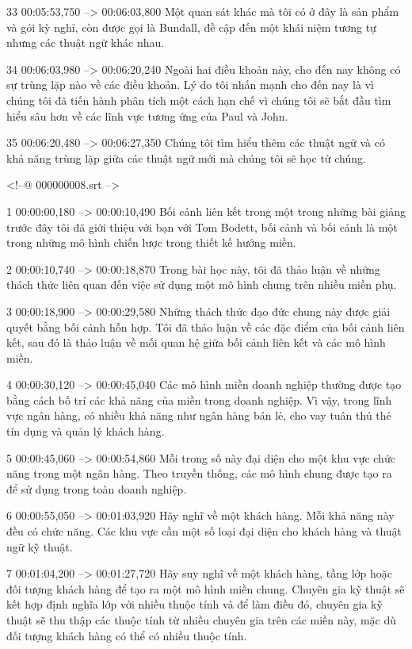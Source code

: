 33
00:05:53,750 --> 00:06:03,800
Một quan sát khác mà tôi có ở đây là sản phẩm và gói kỳ nghỉ, còn được gọi là Bundall, đề cập đến một khái niệm tương tự nhưng các thuật ngữ khác nhau.

34
00:06:03,980 --> 00:06:20,240
Ngoài hai điều khoản này, cho đến nay không có sự trùng lặp nào về các điều khoản.  Lý do tôi nhấn mạnh cho đến nay là vì chúng tôi đã tiến hành phân tích một cách hạn chế vì chúng tôi sẽ bắt đầu tìm hiểu sâu hơn về các lĩnh vực tương ứng của Paul và John.

35
00:06:20,480 --> 00:06:27,350
Chúng tôi tìm hiểu thêm các thuật ngữ và có khả năng trùng lặp giữa các thuật ngữ mới mà chúng tôi sẽ học từ chúng.

<!--@ 000000008.srt -->

1
00:00:00,180 --> 00:00:10,490
Bối cảnh liên kết trong một trong những bài giảng trước đây tôi đã giới thiệu với bạn với Tom Bodett, bối cảnh và bối cảnh là một trong những mô hình chiến lược trong thiết kế hướng miền.

2
00:00:10,740 --> 00:00:18,870
Trong bài học này, tôi đã thảo luận về những thách thức liên quan đến việc sử dụng một mô hình chung trên nhiều miền phụ.

3
00:00:18,900 --> 00:00:29,580
Những thách thức đạo đức chung này được giải quyết bằng bối cảnh hỗn hợp.  Tôi đã thảo luận về các đặc điểm của bối cảnh liên kết, sau đó là thảo luận về mối quan hệ giữa bối cảnh liên kết và các mô hình miền.

4
00:00:30,120 --> 00:00:45,040
Các mô hình miền doanh nghiệp thường được tạo bằng cách bố trí các khả năng của miền trong doanh nghiệp.  Vì vậy, trong lĩnh vực ngân hàng, có nhiều khả năng như ngân hàng bán lẻ, cho vay tuân thủ thẻ tín dụng và quản lý khách hàng.

5
00:00:45,060 --> 00:00:54,860
Mỗi trong số này đại diện cho một khu vực chức năng trong một ngân hàng.  Theo truyền thống, các mô hình chung được tạo ra để sử dụng trong toàn doanh nghiệp.

6
00:00:55,050 --> 00:01:03,920
Hãy nghĩ về một khách hàng.  Mỗi khả năng này đều có chức năng.  Các khu vực cần một số loại đại diện cho khách hàng và thuật ngữ kỹ thuật.

7
00:01:04,200 --> 00:01:27,720
Hãy suy nghĩ về một khách hàng, tầng lớp hoặc đối tượng khách hàng để tạo ra một mô hình miền chung.  Chuyên gia kỹ thuật sẽ kết hợp định nghĩa lớp với nhiều thuộc tính và để làm điều đó, chuyên gia kỹ thuật sẽ thu thập các thuộc tính từ nhiều chuyên gia trên các miền này, mặc dù đối tượng khách hàng có thể có nhiều thuộc tính.

